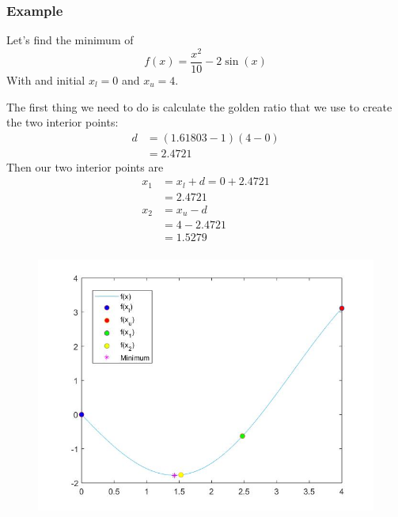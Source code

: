 \documentclass{if-beamer}
\begin{document}
\begin{frame}
\frametitle{Example}
Let's find the minimum of 
$$f(x) = \frac{x^2}{10}-2\sin(x)$$
With and initial $x_l = 0$ and $x_u = 4$. \\\vspace{10pt}

\begin{minipage}{0.4\textwidth}
	The first thing we need to do is calculate the golden ratio that we use to create the two interior points:
	\begin{align*}
	d &= (1.61803-1)(4-0)\\
	 &=  2.4721
	\end{align*}
	Then our two interior points are 
	\begin{align*}
		x_1 &= x_l + d  = 0 + 2.4721 \\
		&= 2.4721 \\
		x_2 &= x_u - d \\  
		&= 4 - 2.4721 \\
		&= 1.5279\\
	\end{align*}
\end{minipage}
\begin{minipage}{0.6\textwidth}
	\begin{figure}
		\centering
		\includegraphics[width = 1.2\textwidth]{figures/iter1.jpg}
	\end{figure}
\end{minipage}
\end{frame}
\end{document}
